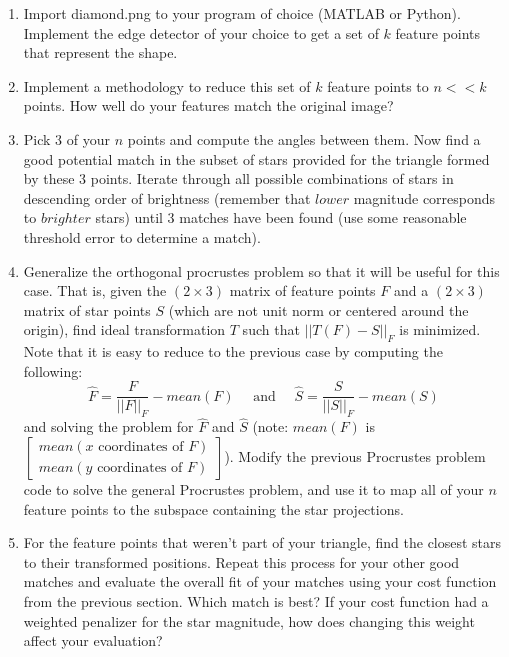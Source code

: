 \documentclass[paper=a4, fontsize=11pt]{scrartcl} %
\begin{document}
\begin{enumerate}
  \item
  Import diamond.png to your program of choice (MATLAB or Python). Implement the edge detector of your choice to get a set of $k$ feature points that represent the shape. 
  \item 
  Implement a methodology to reduce this set of $k$ feature points to $n << k$  points. How well do your features match the original image?
  \item
  Pick $3$ of your $n$ points and compute the angles between them. Now find a good potential match in the subset of stars provided for the triangle formed by these 3 points. Iterate through all possible combinations of stars in descending order of brightness (remember that $lower$ magnitude corresponds to $brighter$ stars) until 3 matches have been found (use some reasonable threshold error to determine a match).
  \item
  Generalize the orthogonal procrustes problem so that it will be useful for this case. That is, given the $(2\times 3)$ matrix of feature points $F$ and a  $(2\times 3)$ matrix of star points $S$ (which are not unit norm or centered around the origin), find ideal transformation $T$ such that $||T(F)-S||_F$ is minimized.  Note that it is easy to reduce to the previous case by computing the following:
  $$
  \hat{F} = \frac{F}{||F||_F} - mean(F)\quad\textrm{ and }\quad\hat{S} = \frac{S}{||S||_F} - mean(S)
  $$
  and solving the problem for $\hat{F}$ and $\hat{S}$ (note: $mean(F)$ is $\begin{bmatrix}
mean(x \textrm{ coordinates of } F)\\
mean(y \textrm{ coordinates of } F)
  \end{bmatrix}$). Modify the previous Procrustes problem code to solve the general Procrustes problem, and use it to map all of your $n$ feature points to the subspace containing the star projections.
  \item
  For the feature points that weren't part of your triangle, find the closest stars to their transformed positions. Repeat this process for your other good matches and evaluate the overall fit of your matches using your cost function from the previous section. Which match is best? If your cost function had a weighted penalizer for the star magnitude, how does changing this weight affect your evaluation?
\end{enumerate}



\end{document}
